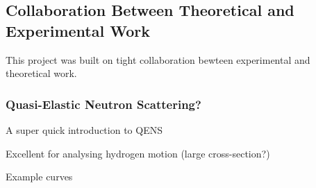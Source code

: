\subsection{Collaboration Between Theoretical and Experimental Work}
\label{sec:cooperation}

This project was built on tight collaboration bewteen experimental and theoretical work.

\placeholder

\subsubsection{Quasi-Elastic Neutron Scattering?}
\bit
\item A super quick introduction to QENS
\item Excellent for analysing hydrogen motion (large cross-section?)
\item Example curves
\eit

\placeholder
